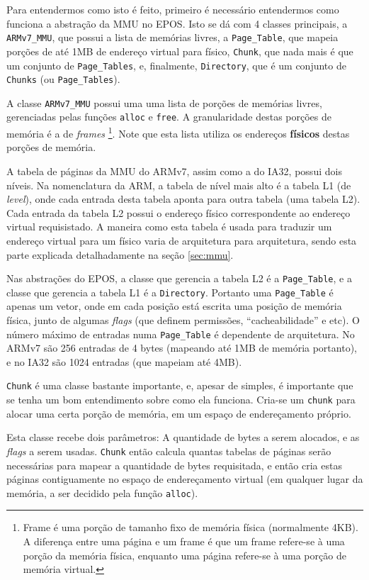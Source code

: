 
Para entendermos como isto é feito, primeiro é necessário entendermos como funciona a abstração da MMU no EPOS. Isto se dá com 4 classes principais, a \verb+ARMv7_MMU+, que possui a lista de memórias livres, a \verb+Page_Table+, que mapeia porções de até 1MB de endereço virtual para físico, \verb+Chunk+, que nada mais é que um conjunto de \verb+Page_Tables+, e, finalmente, \verb+Directory+, que é um conjunto de \verb+Chunks+ (ou \verb+Page_Tables+).

A classe \verb+ARMv7_MMU+ possui uma uma lista de porções de memórias livres, gerenciadas pelas funções \verb+alloc+ e \verb+free+. A granularidade destas porções de memória é a de \emph{frames}
\footnote{Frame é uma porção de tamanho fixo de memória física (normalmente 4KB). A diferença entre uma página e um frame é que um frame refere-se à uma porção da memória física, enquanto uma página refere-se à uma porção de memória virtual.}.
Note que esta lista utiliza os endereços \textbf{físicos} destas porções de memória.

A tabela de páginas da MMU do ARMv7, assim como a do IA32, possui dois níveis. Na nomenclatura da ARM, a tabela de nível mais alto é a tabela L1 (de \emph{level}), onde cada entrada desta tabela aponta para outra tabela (uma tabela L2).
Cada entrada da tabela L2 possui o endereço físico correspondente ao endereço virtual requisistado. A maneira como esta tabela é usada para traduzir um endereço virtual para um físico varia de arquitetura para arquitetura, sendo esta parte explicada detalhadamente na seção \ref{sec:mmu}.

Nas abstrações do EPOS, a classe que gerencia a tabela L2 é a \verb+Page_Table+, e a classe que gerencia a tabela L1 é a \verb+Directory+. Portanto uma \verb+Page_Table+ é apenas um vetor, onde em cada posição está escrita uma posição de memória física, junto de algumas \emph{flags} (que definem permissões, ``cacheabilidade'' e etc). O número máximo de entradas numa \verb+Page_Table+ é dependente de arquitetura. No ARMv7 são 256 entradas de 4 bytes (mapeando até 1MB de memória portanto), e no IA32 são 1024 entradas (que mapeiam até 4MB).

\verb+Chunk+ é uma classe bastante importante, e, apesar de simples, é importante que se tenha um bom entendimento sobre como ela funciona.
Cria-se um \verb+chunk+ para alocar uma certa porção de memória, em um espaço de endereçamento próprio. 

Esta classe recebe dois parâmetros: A quantidade de bytes a serem alocados, e as \emph{flags} a serem usadas. \verb+Chunk+ então calcula quantas tabelas de páginas serão necessárias para mapear a quantidade de bytes requisitada, e então cria estas páginas contiguamente no espaço de endereçamento virtual (em qualquer lugar da memória, a ser decidido pela função \verb+alloc+).

